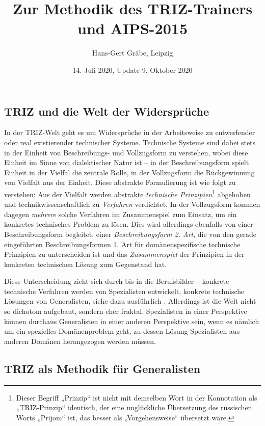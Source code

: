 \documentclass[11pt,a4paper]{article}
\title{Zur Methodik des TRIZ-Trainers und AIPS-2015}
\author{Hans-Gert Gr\"abe, Leipzig}
\date{14. Juli 2020, Update 9. Oktober 2020}
\begin{document}
\maketitle

\subsection*{TRIZ und die Welt der Widersprüche}

In der TRIZ-Welt geht es um Widersprüche in der Arbeitsweise zu entwerfender
oder real existierender technischer Systeme. Technische Systeme sind dabei
stets in der Einheit von Beschreibungs- und Vollzugsform zu verstehen, wobei
diese Einheit im Sinne von \cite{Graebe2020} dialektischer Natur ist -- in der
Beschreibungsform spielt Einheit in der Vielfal die zentrale Rolle, in der
Vollzugsform die Rückgewinnung von Vielfalt aus der Einheit.  Diese abstrakte
Formulierung ist wie folgt zu verstehen: Aus der Vielfalt werden abstrakte
\emph{technische Prinzipien}\footnote{Dieser Begriff „Prinzip“ ist nicht mit
  demselben Wort in der Konnotation als „TRIZ-Prinzip“ identisch, der eine
  unglückliche Übersetzung des russischen Worts „Prijom“ ist, das besser als
  „Vorgehensweise“ übersetzt wäre.} abgehoben und technikwissenschaftlich zu
\emph{Verfahren} verdichtet. In der Vollzugsform kommen dagegen \emph{mehrere}
solche Verfahren im Zusammenspiel zum Einsatz, um ein konkretes technisches
Problem zu lösen. Dies wird allerdings ebenfalls von einer Beschreibungsform
begleitet, einer \emph{Beschreibungsform 2. Art}, die von den gerade
eingeführten Beschreibungsformen 1. Art für domänenspezifische technische
Prinzipien zu unterscheiden ist und das \emph{Zusammenspiel} der Prinzipien in
der konkreten technischen Lösung zum Gegenstand hat.

Diese Unterscheidung zieht sich durch bis in die Berufsbilder -- konkrete
technische Verfahren werden von Spezialisten entwickelt, konkrete technische
Lösungen von Generalisten, siehe dazu ausführlich \cite[Abschnitt
  9]{Graebe2020}.   Allerdings ist die Welt nicht so dichotom aufgebaut,
sondern eher fraktal.  Spezialisten in einer Perspektive können durchaus
Generalisten in einer anderen Perspektive sein, wenn es nämlich um ein
spezielles Domänenproblem geht, zu dessen Lösung Spezialisten aus anderen
Domänen herangezogen werden müssen.

\subsection*{TRIZ als Methodik für Generalisten}
\end{document}
